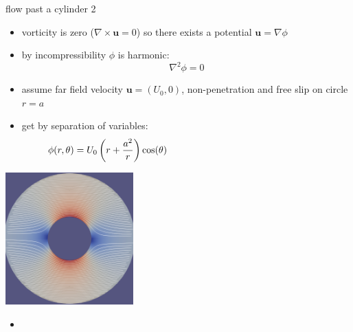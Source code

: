 \documentclass[10pt,hyperref]{beamer}
\newcommand{\bu}{\mathbf{u}}
\newcommand{\grad}{\nabla}
\newcommand{\Curl}{\nabla\times}
\begin{document}
\begin{frame}{flow past a cylinder 2}

\begin{itemize}
\item vorticity is zero ($\Curl\bu=0$) so there exists a potential $\bu = \grad \phi$
\item by incompressibility $\phi$ is harmonic:
	$$\grad^2 \phi = 0$$
\item assume far field velocity $\bu=(U_0,0)$, non-penetration and free slip on circle $r=a$
\item get by separation of variables:
	$$\phi(r,\theta) = U_0 \left(r + \frac{a^2}{r}\right) \cos(\theta) \hspace{2.3in}$$
\end{itemize}

\vspace{-19mm}
\hfill
\mbox{\includegraphics[width=0.37\textwidth]{figs/flowcyl.png} \qquad}
\end{frame}


\begin{frame}{}

\begin{itemize}
\item 
\end{itemize}
\end{frame}
\end{document}
